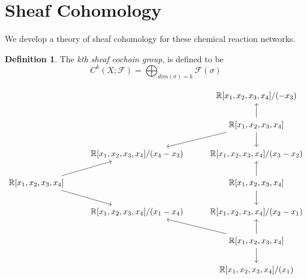 \documentclass[12pt]{article}
\theoremstyle{definition}
\newtheorem{definition}{Definition}
\newcommand{\F}{\mathcal{F}}
\newcommand{\<}{\langle}
\renewcommand{\>}{\rangle}
\begin{document}
\section{Sheaf Cohomology}

We develop a theory of sheaf cohomology for these chemical reaction networks. 
\begin{definition}
  The \textit{kth sheaf cochain group}, is defined to be
  \begin{equation*}
    C^k(X ; \F) = \bigoplus_{dim(\sigma) = k} \F(\sigma)
  \end{equation*}
\end{definition}

\newpage
\[\begin{tikzcd}
	&& {\mathbb{R}[x_1,x_2,x_3,x_4] / (-x_3)} \\
	&& {\mathbb{R}[x_1,x_2,x_3,x_4]} \\
	& {\mathbb{R}[x_1,x_2,x_3,x_4] / (x_4 -x_3)} & {\mathbb{R}[x_1,x_2,x_3,x_4]/(x_3-x_2)} \\
	{\mathbb{R}[x_1,x_2,x_3,x_4]} && {\mathbb{R}[x_1,x_2,x_3,x_4]} \\
	& {\mathbb{R}[x_1,x_2,x_3,x_4] /(x_1 - x_4)} & {\mathbb{R}[x_1,x_2,x_3,x_4] / (x_2 - x_1)} \\
	&& {\mathbb{R}[x_1,x_2,x_3,x_4]} \\
	&& {\mathbb{R}[x_1,x_2,x_3,x_4] / (x_1)}
	\arrow[from=2-3, to=1-3]
	\arrow[from=2-3, to=3-2]
	\arrow[from=2-3, to=3-3]
	\arrow[from=4-1, to=3-2]
	\arrow[from=4-1, to=5-2]
	\arrow[from=4-3, to=3-3]
	\arrow[from=4-3, to=5-3]
	\arrow[from=6-3, to=5-2]
	\arrow[from=6-3, to=5-3]
	\arrow[from=6-3, to=7-3]
\end{tikzcd}\]
\end{document}
